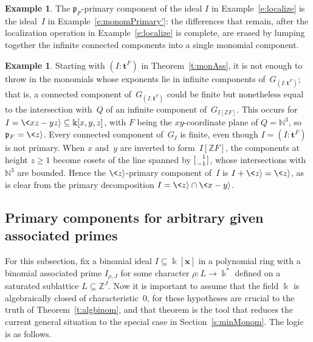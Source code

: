 \documentclass[12pt]{amsart}
\numberwithin{equation}{section}
\theoremstyle{definition}
\newtheorem{example}[thm]{Example}
\begin{document}
\begin{example}
The ${\mathfrak{p}}_F$-primary component of the ideal $I$ in
Example~\ref{e:localize} is the ideal~$I$ in
Example~\ref{e:monomPrimary'}: the differences that remain, after the
localization operation in Example~\ref{e:localize} is complete, are
erased by lumping together the infinite connected components into a
single monomial component.
\end{example}

\begin{example}\label{e:finite'}
Starting with $(I:{\mathbf{t}}^F)$ in Theorem~\ref{t:monAss}, it is not enough
to throw in the monomials whose exponents lie in infinite components
of~$G_{(I:{\mathbf{t}}^F)}$; that is, a connected component
of~$G_{(I:{\mathbf{t}}^F)}$ could be finite but nonetheless equal to the
intersection with~$Q$ of an infinite component of~$G_{I[{\mathbb{Z}} F]}$.
This occurs for $I = \<xz - yz{\rangle} \subseteq {\Bbbk}[x,y,z]$, with $F$ being
the $xy$-coordinate plane of $Q = {\mathbb{N}}^3$, so ${\mathfrak{p}}_F = \<z{\rangle}$.  Every
connected component of~$G_I$ is finite, even though $I = (I:{\mathbf{t}}^F)$
is not primary.  When $x$ and~$y$ are inverted to form~$I[{\mathbb{Z}} F]$, the
components at height $z \geq 1$ become cosets of the line spanned by
$[{{{\genfrac{}{}{0pt}{1}{{\scriptstyle {{\phantom-1}}}}{{\scriptstyle {{-1}}}}}}}]$, whose intersections with ${\mathbb{N}}^3$ are
bounded.  Hence the $\<z{\rangle}$-primary component of~$I$ is $I + \<z{\rangle} =
\<z{\rangle}$, as is clear from the primary decomposition $I = \<z{\rangle} \cap
\<x-y{\rangle}$.
\end{example}

\subsection{Primary components for arbitrary given associated primes}\label{s:given}

For this subsection, fix a binomial ideal $I \subseteq {\Bbbk}[{\mathbf{x}}]$ in a
polynomial ring with a binomial associated prime $I_{\rho,J}$ for some
character $\rho: L \to {\Bbbk}^*$ defined on a saturated sublattice $L
\subseteq {\mathbb{Z}}^J$.
Now it is important to assume that the field ${\Bbbk}$ is algebraically
closed of characteristic~$0$, for these hypotheses are crucial to the
truth of Theorem~\ref{t:algbinom}, and that theorem is the tool that
reduces the current general situation to the special case in
Section~\ref{s:minMonom}.  The logic is as follows.
\end{document}
